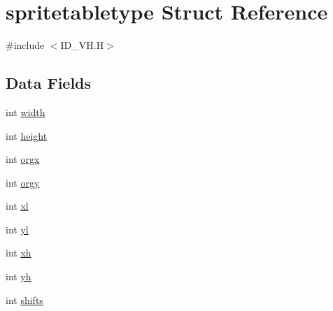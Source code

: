 \hypertarget{structspritetabletype}{
\section{spritetabletype Struct Reference}
\label{structspritetabletype}
}


{\ttfamily \#include $<$ID\_\-VH.H$>$}

\subsection*{Data Fields}
\begin{DoxyCompactItemize}
\item 
int \hyperlink{structspritetabletype_ae0c14da0461f33dd67c94e9be6787624}{width}
\item 
int \hyperlink{structspritetabletype_a6dbc39dae0a62785723e10d3bd796368}{height}
\item 
int \hyperlink{structspritetabletype_a078c4f0a139f1a3658f41457f58fed65}{orgx}
\item 
int \hyperlink{structspritetabletype_a0986d2134127ebb94251c59e297e45de}{orgy}
\item 
int \hyperlink{structspritetabletype_a18d810e53225f452c96316f4a1986968}{xl}
\item 
int \hyperlink{structspritetabletype_a42732eac474e99136a774fa7700b05a7}{yl}
\item 
int \hyperlink{structspritetabletype_a4f58c2b1994e93a39a30a91034698c69}{xh}
\item 
int \hyperlink{structspritetabletype_a5a64e2ba0001e6558290ffbff9953da2}{yh}
\item 
int \hyperlink{structspritetabletype_a0b8bd1c80bde486d100656f4b1a77da4}{shifts}
\end{DoxyCompactItemize}


